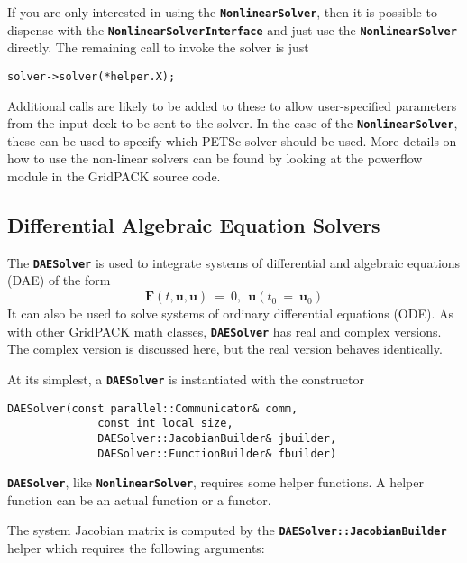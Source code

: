 If you are only interested in using the \texttt{\textbf{NonlinearSolver}}, then it is possible to dispense with the \texttt{\textbf{NonlinearSolverInterface}} and just use the \texttt{\textbf{NonlinearSolver}} directly. The remaining call to invoke the solver is just

{
\color{red}
\begin{Verbatim}[fontseries=b]
  solver->solver(*helper.X);
\end{Verbatim}
}

Additional calls are likely to be added to these to allow user-specified parameters from the input deck to be sent to the solver. In the case of the \texttt{\textbf{NonlinearSolver}}, these can be used to specify which PETSc solver should be used. More details on how to use the non-linear solvers can be found by looking at the powerflow module in the GridPACK source code.


\subsection{Differential Algebraic Equation Solvers}
\label{sec:dae-solver}

The \texttt{\textbf{DAESolver}} is used to integrate systems of
differential and algebraic equations (DAE) of the form
\[
  \mathbf{F} \left( t, \mathbf{u}, \mathbf{\dot{u}} \right) ~=~ 0, ~~ \mathbf{u} \left( t_{0} ~ = ~ \mathbf{u}_{0}
  \right)
\]
It can also be used to solve systems of ordinary differential
equations (ODE).  As with other GridPACK math classes,
\textbf{\texttt{DAESolver}} has real and complex versions.  The
complex version is discussed here, but the real version behaves
identically.

At its simplest, a \texttt{\textbf{DAESolver}} is instantiated with
the constructor

{
\color{red}
\begin{Verbatim}[fontseries=b]
    DAESolver(const parallel::Communicator& comm, 
              const int local_size,
              DAESolver::JacobianBuilder& jbuilder,
              DAESolver::FunctionBuilder& fbuilder)
\end{Verbatim}
}

\texttt{\textbf{DAESolver}}, like \texttt{\textbf{NonlinearSolver}},
requires some helper functions.  A helper function can be an actual
function or a functor.  

The system Jacobian matrix is computed by the
\texttt{\textbf{DAESolver::JacobianBuilder}} helper which requires the
following arguments:

